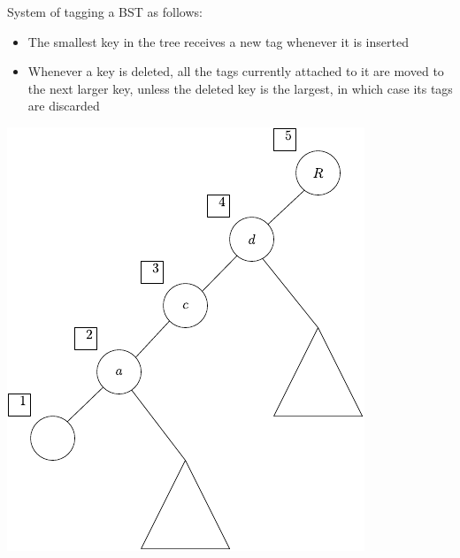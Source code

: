 \documentclass{beamer}
\begin{document}
\begin{frame}
    System of tagging a BST as follows:
    \begin{itemize}
        \item The smallest key in the tree receives a new tag whenever it is inserted
        \item Whenever a key is deleted, all the tags currently attached to it are moved to the next larger key, unless the deleted key is the largest, in which case its tags are discarded
    \end{itemize}
\end{frame}

\begin{frame}
    \begin{center}
        \includegraphics{tag.pdf}
    \end{center}
\end{frame}
\end{document}
